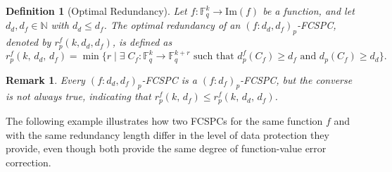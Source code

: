 \documentclass[11pt,draftclsnofoot,journal,onecolumn]{IEEEtran}
\newtheorem{definition}{Definition}
\newtheorem{remark}{Remark}
\begin{document}
    \begin{definition}[Optimal Redundancy]
     \label{def: opt_r}
     Let $f : \mathbb{F}_q^k \to \mathrm{Im}(f)$ be a function, and let $d_d, d_f \in \mathbb{N}$ with $d_d \leq d_f$. The optimal redundancy of an $(f : d_d, d_f)_p$-FCSPC, denoted by $r_p^f(k ,d_d, d_f)$, is defined as
     \[
        r_p^f(k, \, d_d, \, d_f) = \min\{ r\;| \; \exists \; C_f: \mathbb{F}_q^k \rightarrow\mathbb{F}_q^{k+r} \text{ such that } d_p^f(C_f) \geq d_f \text{ and } d_p(C_f) \geq d_d\}.
     \]
    \end{definition}

    \begin{remark}
    \label{rem:r_f-r_d_f}
        Every $(f : d_d, d_f)_p$-FCSPC is a $(f : d_f)_p$-FCSPC, but the converse is not always true, indicating that $r_p^f(k, \, d_f) \leq r_p^f(k, \, d_d, \, d_f)$.
    \end{remark}
    
    
    

    
    


       
    \noindent 
    The following example illustrates how two FCSPCs for the same function $f$ and with the same redundancy length differ in the level of data protection they provide, even though both provide the same degree of function-value error correction.
\end{document}
